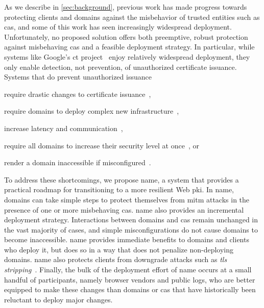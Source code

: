 As we describe in \autoref{sec:background}, previous work has made progress
towards protecting clients and domains against the misbehavior of trusted
entities such as \acp{ca}, and some of this work has seen increasingly
widespread deployment. Unfortunately, no proposed solution offers both
preemptive, robust protection against misbehaving \acp{ca} and a feasible
deployment strategy. In particular, while systems like Google's \ac{ct}
project~\cite{rfc6962,ct-laurie} enjoy relatively widespread deployment, they
only enable detection, not prevention, of unauthorized certificate issuance.
Systems that do prevent unauthorized issuance 
\begin{inparaenum}
\item require drastic changes to certificate issuance~\cite{kim2013accountable},
\item require domains to deploy complex new infrastructure~\cite{rfc6698,
  szalachowski2014policert},
\item increase latency and communication~\cite{yu2016dtki},
\item require all domains to increase their security level at
  once~\cite{basin2014arpki}, or
\item render a domain inaccessible if misconfigured~\cite{palmer2017intent}.
\end{inparaenum}

To address these shortcomings, we propose \ac{name}, a system that provides a
practical roadmap for transitioning to a more resilient Web \ac{pki}. 
In \ac{name}, domains can take simple steps to protect themselves from
\ac{mitm} attacks in the presence of one or more misbehaving \acp{ca}.
\ac{name} also provides an incremental deployment strategy. Interactions
between domains and \acp{ca} remain unchanged in the vast majority of cases, and
simple misconfigurations do not cause domains to become inaccessible. \ac{name}
provides immediate benefits to domains and clients who deploy it, but does so in
a way that does not penalize non-deploying domains. \ac{name} also protects
clients from downgrade attacks such as \emph{\ac{tls}
stripping}~\cite{marlinspike2009new}. Finally, the bulk of the
deployment effort of \ac{name} occurs at a small handful of participants,
namely browser vendors and public logs, who are better equipped to make these
changes than domains or \acp{ca} that have historically been reluctant to deploy
major changes.


